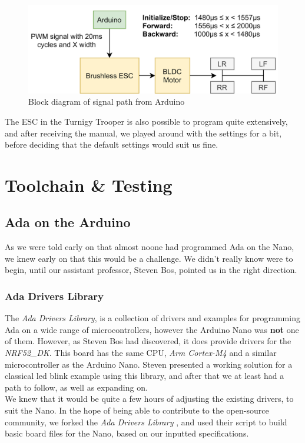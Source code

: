 \documentclass{article}
\begin{document}
\begin{figure}[H]
	\centering
	\includegraphics[width=\linewidth]{brushless-motor-esc.png}
	\caption{Block diagram of signal path from Arduino}
	\label{esc}
\end{figure}


The ESC in the Turnigy Trooper is also possible to program quite extensively, and after receiving the manual, we played around with the settings for a bit, before deciding that the default settings would suit us fine.

\section{Toolchain \& Testing}
\subsection{Ada on the Arduino}
As we were told early on that almost noone had programmed Ada on the Nano, we knew early on that this would be a challenge. We didn't really know were to begin, until our assistant professor, Steven Bos, pointed us in the right direction.

\subsubsection{Ada Drivers Library}

The \textit{Ada Drivers Library}, is a collection of drivers and examples for programming Ada on a wide range of microcontrollers, however the Arduino Nano was \textbf{not} one of them. However, as Steven Bos had discovered, it does provide drivers for the \textit{NRF52\_DK}. This board has the same CPU, \textit{Arm Cortex-M4} and a similar microcontroller as the Arduino Nano. Steven presented a working solution for a classical led blink example using this library, and after that we at least had a path to follow, as well as expanding on.\\

We knew that it would be quite a few hours of adjusting the existing drivers, to suit the Nano. In the hope of being able to contribute to the open-source community, we forked the \textit{Ada Drivers Library}
, and used their script to build basic board files for the Nano, based on our inputted specifications.
\end{document}
